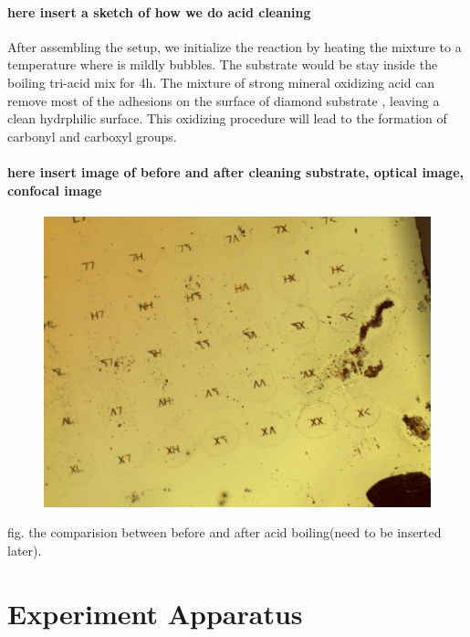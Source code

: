 \paragraph{here insert a sketch of how we do acid cleaning} 

After assembling the setup, we initialize the reaction by heating the mixture to a temperature where is mildly bubbles. The substrate would be stay inside the boiling tri-acid mix for 4h. 
The mixture of strong mineral oxidizing acid can remove most of the adhesions on the surface of diamond substrate , leaving a clean hydrphilic surface. This oxidizing procedure will lead to the formation of carbonyl and carboxyl groups.




\paragraph {here insert image of before and after cleaning substrate, optical image, confocal image }
\FloatBarrier
\begin{figure}[h]
\centering
\includegraphics[width=1\linewidth]{Figures/pic/image470}
\caption{}
\label{fig:image470}
\end{figure}
\FloatBarrier
fig. the comparision between before and after acid boiling(need to be inserted later).
 

\section[experiment apparatus]{Experiment Apparatus}


